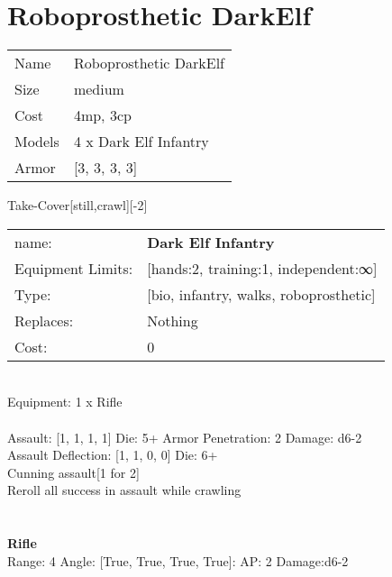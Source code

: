 \pagebreak\pagebreak

\section{ Roboprosthetic DarkElf }

\begin{tabular}{ll}
  Name & Roboprosthetic DarkElf \\
  Size & medium\\
  Cost & 4mp, 3cp\\
  Models & 4 x Dark Elf Infantry\\
  Armor & [3, 3, 3, 3]\\
\end{tabular}

\noindent Take-Cover[still,crawl][-2]\\ 


\noindent
\begin{tabular}{ll}
name: &{\bf Dark Elf Infantry } \\
Equipment Limits: &[hands:2, training:1, independent:∞] \\
Type: &[bio, infantry, walks, roboprosthetic] \\
Replaces: &Nothing \\
Cost: & 0\\
\end{tabular}
\ \\
Equipment: 1 x Rifle \\
\ \\
Assault: [1, 1, 1, 1] Die: 5+ Armor Penetration: 2 Damage: d6-2 \\
Assault Deflection: [1, 1, 0, 0] Die: 6+\\
\indent Cunning assault[1 for 2]\\ 
Reroll all success in assault while crawling\\ 
 
\ \\

\ \\
{\bf Rifle } \\



Range: 4  Angle: [True, True, True, True]: AP: 2 Damage:d6-2 \\




 
\ \\



